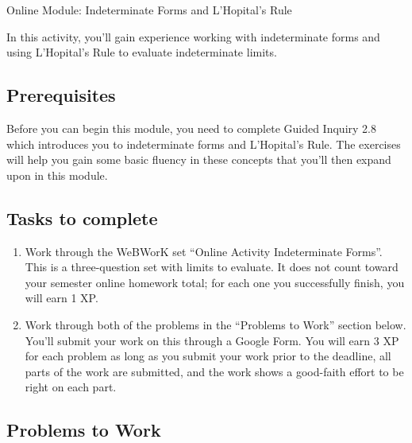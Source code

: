 \documentclass[11pt]{article}
\begin{document}
\begin{center}
    \Large{Online Module: Indeterminate Forms and L'Hopital's Rule}
\end{center}

\noindent
In this activity, you'll gain experience working with indeterminate forms and using L'Hopital's Rule to evaluate indeterminate limits. 

\subsection*{Prerequisites}

Before you can begin this module, you need to complete Guided Inquiry 2.8 which introduces you to indeterminate forms and L'Hopital's Rule. The exercises will help you gain some basic fluency in these concepts that you'll then expand upon in this module. 

\subsection*{Tasks to complete}

\begin{enumerate}
    \item Work through the WeBWorK set ``Online Activity Indeterminate Forms''. This is a three-question set with limits to evaluate. It does not count toward your semester online homework total; for each one you successfully finish, you will earn 1 XP. 
    \item Work through both of the problems in the ``Problems to Work'' section below. You'll submit your work on this through a Google Form. You will earn 3 XP for each problem as long as you submit your work prior to the deadline, all parts of the work are submitted, and the work shows a good-faith effort to be right on each part. 
\end{enumerate}
    
\subsection*{Problems to Work}
    
\end{document}
